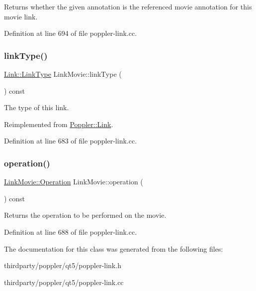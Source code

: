 Returns whether the given {\ttfamily annotation} is the referenced movie annotation for this movie {\ttfamily link}. 

Definition at line 694 of file poppler-\/link.\+cc.

\mbox{\label{class_poppler_1_1_link_movie_a01b861d592530f64d3b35a2618ba21e6}} 
\subsubsection{\texorpdfstring{link\+Type()}{linkType()}}
{\footnotesize\ttfamily \hyperlink{class_poppler_1_1_link_af0dacfa77a548bb043dbae4bb9dc6c1e}{Link\+::\+Link\+Type} Link\+Movie\+::link\+Type (\begin{DoxyParamCaption}{ }\end{DoxyParamCaption}) const\hspace{0.3cm}{\ttfamily [virtual]}}

The type of this link. 

Reimplemented from \hyperlink{class_poppler_1_1_link_a3e3ad7e8867e255c24b9a562bad596ed}{Poppler\+::\+Link}.



Definition at line 683 of file poppler-\/link.\+cc.

\mbox{\label{class_poppler_1_1_link_movie_a38addd0e44a3f58b8fa8edf451a45830}} 
\subsubsection{\texorpdfstring{operation()}{operation()}}
{\footnotesize\ttfamily \hyperlink{class_poppler_1_1_link_movie_a66b83ca2658b31b448e4b4696cb452ba}{Link\+Movie\+::\+Operation} Link\+Movie\+::operation (\begin{DoxyParamCaption}{ }\end{DoxyParamCaption}) const}

Returns the operation to be performed on the movie. 

Definition at line 688 of file poppler-\/link.\+cc.



The documentation for this class was generated from the following files\+:\begin{DoxyCompactItemize}
\item 
thirdparty/poppler/qt5/poppler-\/link.\+h\item 
thirdparty/poppler/qt5/poppler-\/link.\+cc\end{DoxyCompactItemize}

